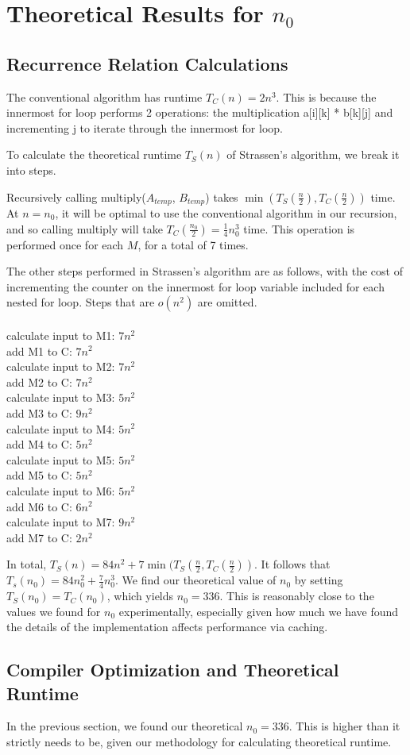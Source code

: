 \documentclass{article}
\begin{document}
\section*{Theoretical Results for $n_0$} 
\subsection*{Recurrence Relation Calculations}
The conventional algorithm has runtime $T_C (n) = 2 n^3$. This is because the innermost for loop performs 2 operations: the multiplication a[i][k] * b[k][j] and incrementing j to iterate through the innermost for loop. 

To calculate the theoretical runtime $T_S(n)$ of Strassen's algorithm, we break it into steps. 

Recursively calling multiply($A_{temp}$, $B_{temp}$) takes $\min(T_S(\frac{n}{2}), T_C(\frac{n}{2}))$ time. At $n=n_0$, it will be optimal to use the conventional algorithm in our recursion, and so calling multiply will take $T_C(\frac{n_0}{2}) = \frac{1}{4} n_0^3$ time. This operation is performed once for each $M$, for a total of 7 times. 

The other steps performed in Strassen's algorithm are as follows, with the cost of incrementing the counter on the innermost for loop variable included for each nested for loop. Steps that are $o(n^2)$ are omitted. \\\\
calculate input to M1: $7n^2$\\
add M1 to C: $7 n^2$\\
calculate input to M2: $7n^2$\\
add M2 to C: $7n^2$\\
calculate input to M3: $5n^2$\\
add M3 to C: $9 n^2$\\
calculate input to M4: $5n^2$\\
add M4 to C: $5n^2$\\
calculate input to M5: $5n^2$\\
add M5 to C: $5 n^2$\\
calculate input to M6: $5 n^2$\\
add M6 to C: $6 n^2$\\
calculate input to M7: $9 n^2$\\
add M7 to C: $2n^2$

In total, $T_S(n) = 84 n^2 + 7 \min(T_S(\frac{n}{2}, T_C(\frac{n}{2}))$. It follows that $T_s(n_0) = 84 n_0^2 + \frac{7}{4} n_0^3$. We find our theoretical value of $n_0$ by setting $T_S(n_0) = T_C (n_0)$, which yields $n_0 = 336$. This is reasonably close to the values we found for $n_0$ experimentally, especially given how much we have found the details of the implementation affects performance via caching. 

\subsection*{Compiler Optimization and Theoretical Runtime}
In the previous section, we found our theoretical $n_0 = 336$. This is higher than it strictly needs to be, given our methodology for calculating theoretical runtime. 
\end{document}
